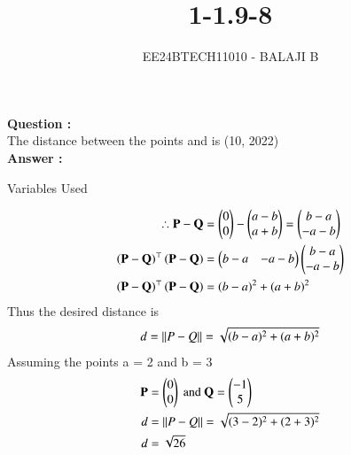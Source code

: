 \documentclass[journal]{IEEEtran}
\begin{document}

\vspace{3cm}

\title{1-1.9-8}
\author{EE24BTECH11010 - BALAJI B
}
{\let\newpage\relax\maketitle}

\renewcommand{\thefigure}{\theenumi}
\renewcommand{\thetable}{\theenumi}
\setlength{\intextsep}{10pt} %


\renewcommand{\thetable}{\theenumi}

\textbf{Question :} \\ 
The distance between the points  and  is  \hfill(10, 2022) \\

\textbf{Answer :} \\

\begin{table}[h!]    
  \centering
  
  \caption{Variables Used}
  \label{tab1.9.19.1}
\end{table}
\begin{align}
    \therefore\mathbf{P} - \mathbf{Q} &= \begin{pmatrix}0 \\ 0 \end{pmatrix} - \begin{pmatrix}a - b \\ a + b\end{pmatrix} = \begin{pmatrix}b - a \\ -a -b\end{pmatrix} \\
    \left(\mathbf{P - Q}\right)^\top \left(\mathbf{P - Q}\right) &= \begin{pmatrix}b-a & -a-b\end{pmatrix}\begin{pmatrix}b-a \\ -a-b\end{pmatrix} \\
    \left(\mathbf{P - Q}\right)^\top \left(\mathbf{P - Q}\right) &= (b - a)^2 + (a + b)^2
\end{align} 
Thus the desired distance is 
\begin{align}
    d = \left\lVert P - Q\right\rVert = \sqrt{(b - a)^2 + (a + b)^2}
\end{align}
Assuming the points a = 2 and b = 3 
\begin{align}
    \mathbf{P} &= \begin{pmatrix}0 \\ 0\end{pmatrix} \text{ and }\mathbf{Q} = \begin{pmatrix}-1 \\ 5\end{pmatrix} \\
    d &= \left\lVert P - Q\right\rVert = \sqrt{(3 - 2)^2 + (2 + 3)^2}\\
    d &= \sqrt{26}
\end{align}
\end{document}
